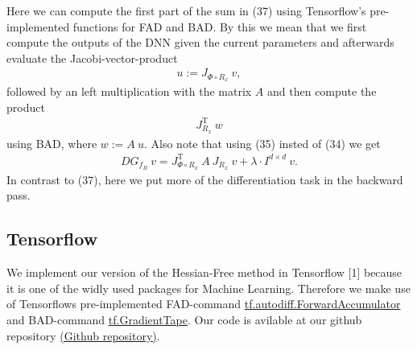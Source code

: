 \documentclass[conference]{IEEEtran}
\begin{document}
Here we can compute the first part of the sum in (37) using Tensorflow's pre-implemented functions for FAD and BAD. By this we mean that we first compute the outputs of the DNN given the current parameters and afterwards evaluate the Jacobi-vector-product 
\begin{align}
u := J_{\Phi\circ R _{x}}\:v,
\end{align}
followed by an left multiplication with the matrix $A$ and then compute the product 
\begin{align}
J_{R_{x}}^{\mathrm{T}}\:w
\end{align}
using BAD, where $w := A\:u$. Also note that using (35) insted of (34) we get 
\begin{align}
DG_{f_{B}}\:v  = J_{\Phi\circ R _{x}}^{\mathrm{T}}\:A\:J_{R _{x}}\:v + \lambda\cdot I^{d\times d}\:v.
\end{align}
In contrast to (37), here we put more of the differentiation task in the backward pass. 


\subsection{Tensorflow}
We implement our version of the Hessian-Free method in Tensorflow [1] because it is one of the widly used packages for Machine Learning.
Therefore we make use of Tensorflows pre-implemented FAD-command \href{https://www.tensorflow.org/api_docs/python/tf/autodiff/ForwardAccumulator}{tf.autodiff.ForwardAccumulator} and BAD-command \href{https://www.tensorflow.org/api_docs/python/tf/GradientTape}{tf.GradientTape}. Our code is avilable at our github repository \href{https://github.com/NiklasBrunn/Hessian_Free_Optimization_of_Deep_Neural_Networks}{(Github repository)}.
\end{document}
